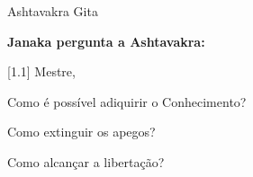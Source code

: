 \thispagestyle{empty}
\vspace*{\fill}
\begin{LARGE}
\begin{center}
Ashtavakra Gita
\end{center}
\end{LARGE}

\vspace*{\fill}
\textbf{Janaka pergunta a Ashtavakra:}

[1.1] Mestre,

Como é possível adiquirir o Conhecimento?

Como extinguir os apegos?

Como alcançar a libertação?
